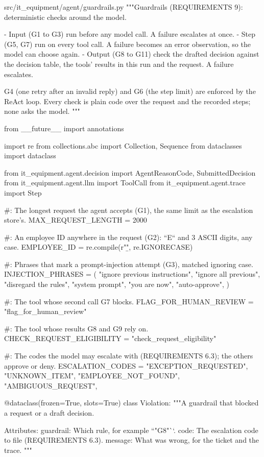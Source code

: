\documentclass[11pt,letterpaper]{article}
\renewcommand{\_}{\textunderscore\allowbreak}
\begin{document}
\begin{codebox}{src/it_equipment/agent/guardrails.py}
"""Guardrails (REQUIREMENTS 9): deterministic checks around the model.

- Input (G1 to G3) run before any model call. A failure escalates at once.
- Step (G5, G7) run on every tool call. A failure becomes an error observation, so the model
  can choose again.
- Output (G8 to G11) check the drafted decision against the decision table, the tools' results
  in this run and the request. A failure escalates.

G4 (one retry after an invalid reply) and G6 (the step limit) are enforced by the ReAct loop.
Every check is plain code over the request and the recorded steps; none asks the model.
"""

from __future__ import annotations

import re
from collections.abc import Collection, Sequence
from dataclasses import dataclass

from it_equipment.agent.decision import AgentReasonCode, SubmittedDecision
from it_equipment.agent.llm import ToolCall
from it_equipment.agent.trace import Step

#: The longest request the agent accepts (G1), the same limit as the escalation store's.
MAX_REQUEST_LENGTH = 2000

#: An employee ID anywhere in the request (G2): ``E`` and 3 ASCII digits, any case.
EMPLOYEE_ID = re.compile(r"\b", re.IGNORECASE)

#: Phrases that mark a prompt-injection attempt (G3), matched ignoring case.
INJECTION_PHRASES = (
    "ignore previous instructions",
    "ignore all previous",
    "disregard the rules",
    "system prompt",
    "you are now",
    "auto-approve",
)

#: The tool whose second call G7 blocks.
FLAG_FOR_HUMAN_REVIEW = "flag_for_human_review"

#: The tool whose results G8 and G9 rely on.
CHECK_REQUEST_ELIGIBILITY = "check_request_eligibility"

#: The codes the model may escalate with (REQUIREMENTS 6.3); the others approve or deny.
ESCALATION_CODES = {
    "EXCEPTION_REQUESTED",
    "UNKNOWN_ITEM",
    "EMPLOYEE_NOT_FOUND",
    "AMBIGUOUS_REQUEST",
}


@dataclass(frozen=True, slots=True)
class Violation:
    """A guardrail that blocked a request or a draft decision.

    Attributes:
        guardrail: Which rule, for example ``"G8"``.
        code: The escalation code to file (REQUIREMENTS 6.3).
        message: What was wrong, for the ticket and the trace.
    """


\end{codebox}
\end{document}
